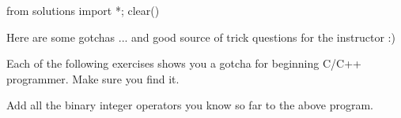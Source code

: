 \begin{python0}
from solutions import *; clear()
\end{python0}

Here are some gotchas ... and good source of trick questions for the
instructor :)

Each of the following exercises shows you a gotcha for beginning C/C++
programmer. Make sure you find it.






Add all the binary integer operators you know so far to the above
program.

